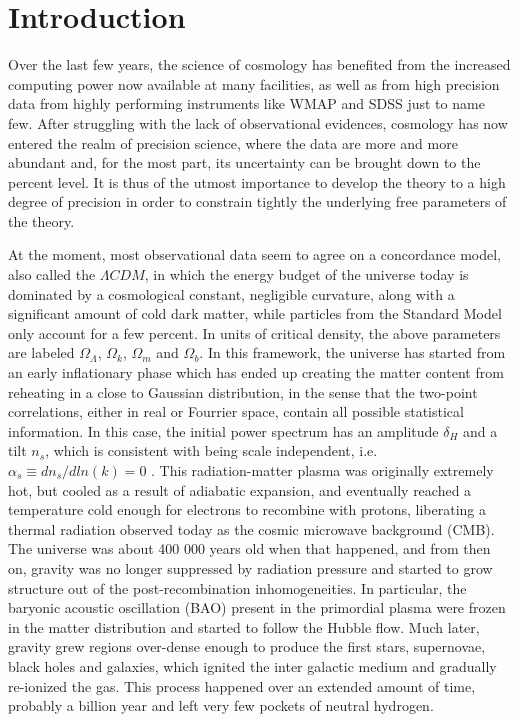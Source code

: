 \section{Introduction}

Over the last few years, the science of cosmology has benefited from the increased computing power now available at many facilities,
as well as from high precision data from highly performing instruments like WMAP \cite{ref:WMAP5} and SDSS \cite{ref:SDSS} just to name  few.
After struggling with the lack of observational evidences, cosmology has now entered the realm of precision science, where the data are more and more abundant and, 
for the most part, its uncertainty can be brought down to the percent level. It is thus of the utmost importance to develop the theory to a high degree of precision
in order to constrain tightly the underlying free parameters of the theory. 

At the moment, most observational data \cite{ref:WMAP5}\cite{ref:SN1A}\cite{ref:BAO} seem to agree on a concordance model, also called the {$\Lambda CDM$}, in which the energy budget of the universe today is dominated by a cosmological constant, negligible curvature, along with a significant amount of cold dark matter, while particles from the Standard Model only account for a few percent. In units of critical density, the above parameters are labeled $\Omega_{\Lambda}$, $\Omega_{k}$, $\Omega_{m}$ and $\Omega_{b}$.
In this framework, the universe has started from an early inflationary phase \cite{ref:inflation} which has ended up
creating the matter content from reheating \cite{ref:reheating} in a close to Gaussian distribution, in the sense that the two-point correlations, either in real or Fourrier space,  contain all possible statistical information. In this case, the initial power spectrum has an amplitude $\delta_{H}$ and a tilt $n_{s}$, which is consistent with being scale independent, i.e.$\alpha_{s} \equiv d n_{s}/d ln(k) =0$ \cite{ref:WMAP5}.
This radiation-matter plasma was originally extremely hot, but cooled as a result of adiabatic expansion, and eventually reached a temperature cold enough for electrons to recombine with protons, liberating a thermal radiation observed today as the cosmic microwave background (CMB). The universe was about 400 000 years old when that happened, and from then on, gravity was no longer suppressed by radiation pressure and started to grow structure out of the post-recombination inhomogeneities. In particular, the baryonic acoustic oscillation (BAO) \cite{ref:AO} present in the primordial plasma were frozen in the matter distribution and started to follow the Hubble flow. Much later, gravity grew regions over-dense enough to produce the first stars, supernovae, black holes and galaxies, which ignited the inter galactic medium and gradually re-ionized the gas. This process happened over an extended amount of time, probably a billion year \cite{ref:Ilian} and left very few pockets of neutral hydrogen.

